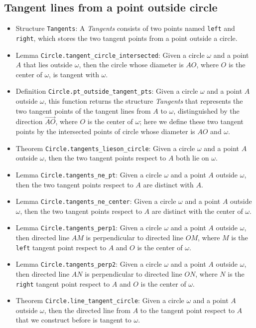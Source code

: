 \documentclass[12pt]{amsart}
\begin{document}
\subsection{Tangent lines from a point outside circle}
\begin{itemize}
    \item Structure \verb|Tangents|: A \emph{Tangents} consists of two points named \verb|left| and \verb|right|, which stores the two tangent points from a point outside a circle.
    \item Lemma \verb|Circle.tangent_circle_intersected|: Given a circle $\omega$ and a point $A$ that lies outside $\omega$, then the circle whose diameter is $AO$, where $O$ is the center of $\omega$, is tangent with $\omega$.
    \item Definition \verb|Circle.pt_outside_tangent_pts|: Given a circle $\omega$ and a point $A$ outside $\omega$, this function returns the structure \emph{Tangents} that represents the two tangent points of the tangent lines from $A$ to $\omega$, distinguished by the direction $\overrightarrow{AO}$, where $O$ is the center of $\omega$; here we define these two tangent points by the intersected points of circle whose diameter is $AO$ and $\omega$.
    \item Theorem \verb|Circle.tangents_lieson_circle|: Given a circle $\omega$ and a point $A$ outside $\omega$, then the two tangent points respect to $A$ both lie on $\omega$.
    \item Lemma \verb|Circle.tangents_ne_pt|: Given a circle $\omega$ and a point $A$ outside $\omega$, then the two tangent points respect to $A$ are distinct with $A$.
    \item Lemma \verb|Circle.tangents_ne_center|: Given a circle $\omega$ and a point $A$ outside $\omega$, then the two tangent points respect to $A$ are distinct with the center of $\omega$.
    \item Lemma \verb|Circle.tangents_perp1|: Given a circle $\omega$ and a point $A$ outside $\omega$, then directed line $AM$ is perpendicular to directed line $OM$, where $M$ is the \verb|left| tangent point respect to $A$ and $O$ is the center of $\omega$.
    \item Lemma \verb|Circle.tangents_perp2|: Given a circle $\omega$ and a point $A$ outside $\omega$, then directed line $AN$ is perpendicular to directed line $ON$, where $N$ is the \verb|right| tangent point respect to $A$ and $O$ is the center of $\omega$.
    \item Theorem \verb|Circle.line_tangent_circle|: Given a circle $\omega$ and a point $A$ outside $\omega$, then the directed line from $A$ to the tangent point respect to $A$ that we construct before is tangent to $\omega$.

\end{itemize}
\end{document}
